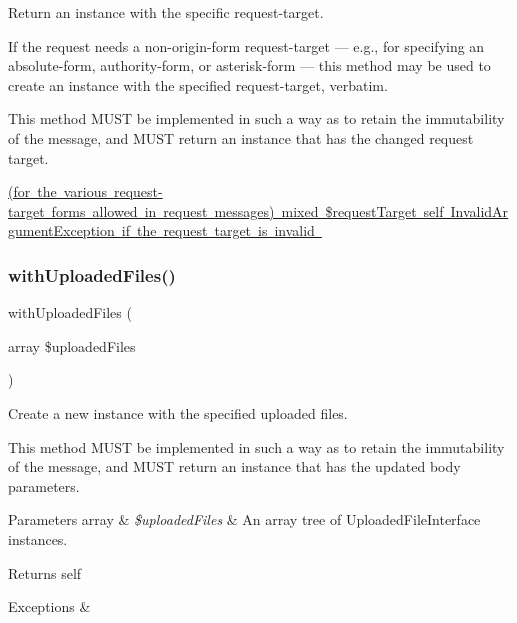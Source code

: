 Return an instance with the specific request-\/target.

If the request needs a non-\/origin-\/form request-\/target — e.\+g., for specifying an absolute-\/form, authority-\/form, or asterisk-\/form — this method may be used to create an instance with the specified request-\/target, verbatim.

This method M\+U\+ST be implemented in such a way as to retain the immutability of the message, and M\+U\+ST return an instance that has the changed request target.

\mbox{\hyperlink{}{(for the various request-\/target forms allowed in request messages)  mixed \$request\+Target  self  Invalid\+Argument\+Exception if the request target is invalid }}\mbox{\label{class_pes_1_1_http_1_1_request_a74e948aa5aa4eaccb08debcf9ff989b0}} 
\subsubsection{\texorpdfstring{with\+Uploaded\+Files()}{withUploadedFiles()}}
{\footnotesize\ttfamily with\+Uploaded\+Files (\begin{DoxyParamCaption}\item[{array}]{\$uploaded\+Files }\end{DoxyParamCaption})}

Create a new instance with the specified uploaded files.

This method M\+U\+ST be implemented in such a way as to retain the immutability of the message, and M\+U\+ST return an instance that has the updated body parameters.


\begin{DoxyParams}[1]{Parameters}
array & {\em \$uploaded\+Files} & An array tree of Uploaded\+File\+Interface instances. \\
\hline
\end{DoxyParams}
\begin{DoxyReturn}{Returns}
self 
\end{DoxyReturn}

\begin{DoxyExceptions}{Exceptions}
{\em } & \\
\hline
\end{DoxyExceptions}
\mbox{\label{class_pes_1_1_http_1_1_request_a1d0023caa7d9c3a9c672538692fc1456}} 
